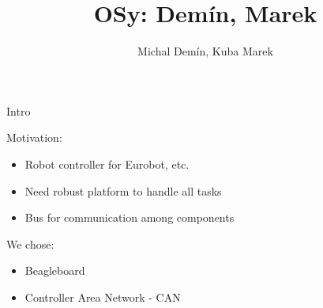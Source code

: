 \documentclass{beamer}
\title{OSy: Demín, Marek}
\author{Michal Demín, Kuba Marek}
\date{}
\begin{document}
\titlepage

\begin{frame}{Intro}

Motivation:
\begin{itemize}
\item Robot controller for Eurobot, etc.
\item Need robust platform to handle all tasks
\item Bus for communication among components
\end{itemize}

We chose:
\begin{itemize}
\item Beagleboard
\item Controller Area Network - CAN
\end{itemize}
\end{frame}
\end{document}
